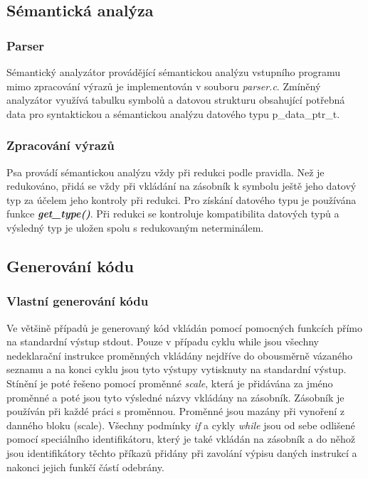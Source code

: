 \documentclass[a4paper, 12pt]{article}
\begin{document}
\newpage

\subsection{Sémantická analýza}
\subsubsection{Parser}
Sémantický analyzátor provádějící sémantickou analýzu vstupního programu mimo zpracování výrazů je implementován v souboru \textit{parser.c}. Zmíněný analyzátor využívá tabulku symbolů a datovou strukturu obsahující potřebná data pro syntaktickou a sémantickou analýzu datového typu p\_data\_ptr\_t.

\subsubsection{Zpracování výrazů}
Psa provádí sémantickou analýzu vždy při redukci podle pravidla. Než je redukováno, přidá se vždy při vkládání na zásobník k symbolu ještě jeho datový typ za účelem jeho kontroly při redukci. Pro získání datového typu je používána funkce \textit{\textbf{get\_type()}}. Při redukci se kontroluje kompatibilita datových typů a výsledný typ je uložen spolu s redukovaným neterminálem.

\subsection{Generování kódu}
\subsubsection{Vlastní generování kódu}
Ve většině případů je generovaný kód vkládán pomocí pomocných funkcích přímo na standardní výstup stdout. Pouze v případu cyklu while jsou všechny nedeklarační instrukce proměnných vkládány nejdříve do obousměrně vázaného seznamu a na konci cyklu jsou tyto výstupy vytisknuty na standardní výstup. Stínění je poté řešeno pomocí proměnné \textit{scale}, která je přidávána za jméno proměnné a poté jsou tyto výsledné názvy vkládány na zásobník. Zásobník je používán při každé práci s proměnnou. Proměnné jsou mazány při vynoření z danného bloku (scale). Všechny podmínky \textit{if} a cykly \textit{while} jsou od sebe odlišené pomocí speciálního identifikátoru, který je také vkládán na zásobník a do něhož jsou identifikátory těchto příkazů přidány při zavolání výpisu daných instrukcí a nakonci jejich funkčí částí odebrány.
\end{document}
